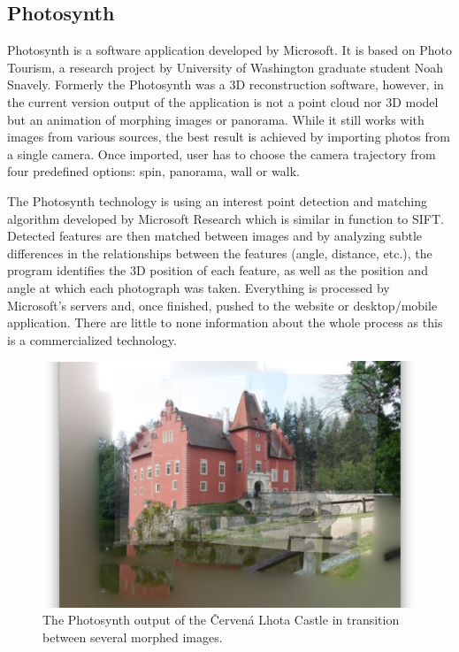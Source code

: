 \subsection*{Photosynth}
Photosynth is a software application developed by Microsoft. It is based on Photo Tourism, a research project by University of Washington graduate student Noah Snavely. Formerly the Photosynth was a 3D reconstruction software, however, in the current version output of the application is not a point cloud nor 3D model but an animation of morphing images or panorama. While it still works with images from various sources, the best result is achieved by importing photos from a single camera. Once imported, user has to choose the camera trajectory from four predefined options: spin, panorama, wall or walk. 

The Photosynth technology is using an interest point detection and matching algorithm developed by Microsoft Research which is similar in function to SIFT. Detected features are then matched between images and by analyzing subtle differences in the relationships between the features (angle, distance, etc.), the program identifies the 3D position of each feature, as well as the position and angle at which each photograph was taken. Everything is processed by Microsoft's servers and, once finished, pushed to the website or desktop/mobile application. There are little to none information about the whole process as this is a commercialized technology. \cite{www:photosynth}

\begin{figure}[ht]
	\begin{center}
		\includegraphics[keepaspectratio,width=\textwidth]{fig/Photosynth.png}
	\end{center}
	\caption{The Photosynth output of the Červená Lhota Castle in transition between several morphed images.}
	\label{fig:visualsfm}
\end{figure}

